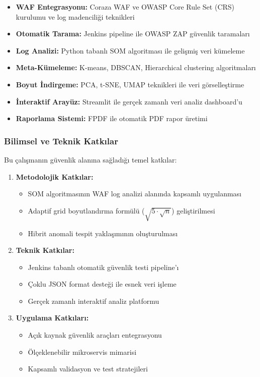 \begin{itemize}
    \item \textbf{WAF Entegrasyonu:} Coraza WAF ve OWASP Core Rule Set (CRS) \cite{owasp_crs} kurulumu ve log madenciliği teknikleri \cite{arslan2020log_madenciligi}
    \item \textbf{Otomatik Tarama:} Jenkins pipeline ile OWASP ZAP güvenlik taramaları
    \item \textbf{Log Analizi:} Python tabanlı SOM algoritması ile gelişmiş veri kümeleme \cite{python_security2021,celik2020python_guvenlik}
    \item \textbf{Meta-Kümeleme:} K-means, DBSCAN, Hierarchical clustering algoritmaları
    \item \textbf{Boyut İndirgeme:} PCA, t-SNE, UMAP teknikleri ile veri görselleştirme
    \item \textbf{İnteraktif Arayüz:} Streamlit ile gerçek zamanlı veri analiz dashboard'u
    \item \textbf{Raporlama Sistemi:} FPDF ile otomatik PDF rapor üretimi
\end{itemize}

\newpage

\subsubsection{Bilimsel ve Teknik Katkılar}

Bu çalışmanın güvenlik alanına sağladığı temel katkılar:

\begin{enumerate}
    \item \textbf{Metodolojik Katkılar:}
    \begin{itemize}
        \item SOM algoritmasının WAF log analizi alanında kapsamlı uygulanması
        \item Adaptif grid boyutlandırma formülü ($\sqrt{5 \cdot \sqrt{n}}$) geliştirilmesi
        \item Hibrit anomali tespit yaklaşımının oluşturulması
    \end{itemize}
    
    \item \textbf{Teknik Katkılar:}
    \begin{itemize}
        \item Jenkins tabanlı otomatik güvenlik testi pipeline'ı
        \item Çoklu JSON format desteği ile esnek veri işleme
        \item Gerçek zamanlı interaktif analiz platformu
    \end{itemize}
    
    \item \textbf{Uygulama Katkıları:}
    \begin{itemize}
        \item Açık kaynak güvenlik araçları entegrasyonu
        \item Ölçeklenebilir mikroservis mimarisi
        \item Kapsamlı validasyon ve test stratejileri
    \end{itemize}
\end{enumerate}


